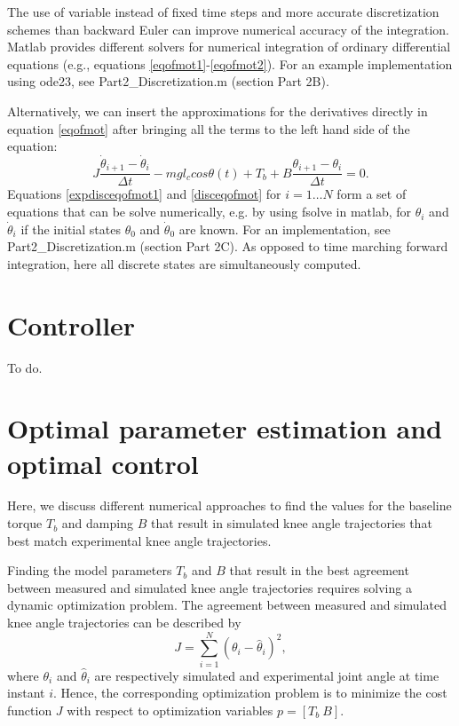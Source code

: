 \documentclass[
a4paper, %
11pt, %
onecolumn, %
openright, %
]{memoir}
\begin{document}
The use of variable instead of fixed time steps and more accurate discretization schemes than backward Euler can improve numerical accuracy of the integration. Matlab provides different solvers for numerical integration of ordinary differential equations (e.g., equations \ref{eqofmot1}-\ref{eqofmot2}). For an example implementation using ode23, see Part2\_Discretization.m (section Part 2B).

Alternatively, we can insert the approximations for the derivatives directly in equation \ref{eqofmot} after bringing all the terms to the left hand side of the equation:
\begin{equation}
J \frac{\dot\theta_{i+1} - \dot\theta_{i}}{\Delta t} - m g l_c cos\theta(t) + T_b + B \frac{\theta_{i+1} - \theta_{i}}{\Delta t} = 0.
\label{disceqofmot}
\end{equation}
Equations \ref{expdisceqofmot1} and \ref{disceqofmot} for $i = 1 \ldots N$ form a set of equations that can be solve numerically, e.g. by using fsolve in matlab, for $\theta_i$ and $\dot{\theta}_i$ if the initial states $\theta_0$ and $\dot{\theta}_0$ are known.  
For an implementation, see Part2\_Discretization.m (section Part 2C).
As opposed to time marching forward integration, here all discrete states are simultaneously computed. %

\chapter{Controller}

To do.

\chapter{Optimal parameter estimation and optimal control}

Here, we discuss different numerical approaches to find the values for the baseline torque $T_b$ and damping $B$ that result in simulated knee angle trajectories that best match experimental knee angle trajectories. 

Finding the model parameters $T_b$ and $B$ that result in the best agreement between measured and simulated knee angle trajectories requires solving a dynamic optimization problem. The agreement between measured and simulated knee angle trajectories can be described by
\begin{equation}
J = \sum_{i = 1}^{N} ( \theta_i - \hat{\theta}_i )^2,
\end{equation}
where $\theta_i$ and $\hat{\theta}_i$ are respectively simulated and experimental joint angle at time instant $i$. Hence, the corresponding optimization problem is to minimize the cost function $J$ with respect to optimization variables $ p = [T_b \: B]$. 
\end{document}
